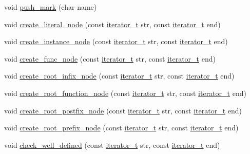 \begin{CompactItemize}
void \hyperlink{namespacegenevalmag_411fcac88bb0937d75b54d20601b6b33}{push\_\-mark} (char name)
\item 
void \hyperlink{namespacegenevalmag_5acc69c06c112cad864e048a095396c5}{create\_\-literal\_\-node} (const \hyperlink{namespacegenevalmag_64946721fb97e58be670a468bf8e7056}{iterator\_\-t} str, const \hyperlink{namespacegenevalmag_64946721fb97e58be670a468bf8e7056}{iterator\_\-t} end)
\item 
void \hyperlink{namespacegenevalmag_931db9fc9546a03ac92ae77ca4ad9f21}{create\_\-instance\_\-node} (const \hyperlink{namespacegenevalmag_64946721fb97e58be670a468bf8e7056}{iterator\_\-t} str, const \hyperlink{namespacegenevalmag_64946721fb97e58be670a468bf8e7056}{iterator\_\-t} end)
\item 
void \hyperlink{namespacegenevalmag_2f41a8b96eb7d5bdca16a4924dcd020f}{create\_\-func\_\-node} (const \hyperlink{namespacegenevalmag_64946721fb97e58be670a468bf8e7056}{iterator\_\-t} str, const \hyperlink{namespacegenevalmag_64946721fb97e58be670a468bf8e7056}{iterator\_\-t} end)
\item 
void \hyperlink{namespacegenevalmag_2a5aaaff7c3b3b8efc446903121a62c6}{create\_\-root\_\-infix\_\-node} (const \hyperlink{namespacegenevalmag_64946721fb97e58be670a468bf8e7056}{iterator\_\-t} str, const \hyperlink{namespacegenevalmag_64946721fb97e58be670a468bf8e7056}{iterator\_\-t} end)
\item 
void \hyperlink{namespacegenevalmag_bf7e87f4c01eacdac90dd0875d9e1f0a}{create\_\-root\_\-function\_\-node} (const \hyperlink{namespacegenevalmag_64946721fb97e58be670a468bf8e7056}{iterator\_\-t} str, const \hyperlink{namespacegenevalmag_64946721fb97e58be670a468bf8e7056}{iterator\_\-t} end)
\item 
void \hyperlink{namespacegenevalmag_d2e6e0ea9f03843a2adb23ea4c43453f}{create\_\-root\_\-postfix\_\-node} (const \hyperlink{namespacegenevalmag_64946721fb97e58be670a468bf8e7056}{iterator\_\-t} str, const \hyperlink{namespacegenevalmag_64946721fb97e58be670a468bf8e7056}{iterator\_\-t} end)
\item 
void \hyperlink{namespacegenevalmag_2947fff1246a0fbe137217896a658a5b}{create\_\-root\_\-prefix\_\-node} (const \hyperlink{namespacegenevalmag_64946721fb97e58be670a468bf8e7056}{iterator\_\-t} str, const \hyperlink{namespacegenevalmag_64946721fb97e58be670a468bf8e7056}{iterator\_\-t} end)
\item 
void \hyperlink{namespacegenevalmag_c8f04dfdf39c964f9219cc5a7fb7197b}{check\_\-well\_\-defined} (const \hyperlink{namespacegenevalmag_64946721fb97e58be670a468bf8e7056}{iterator\_\-t} str, const \hyperlink{namespacegenevalmag_64946721fb97e58be670a468bf8e7056}{iterator\_\-t} end)

\end{CompactItemize}
